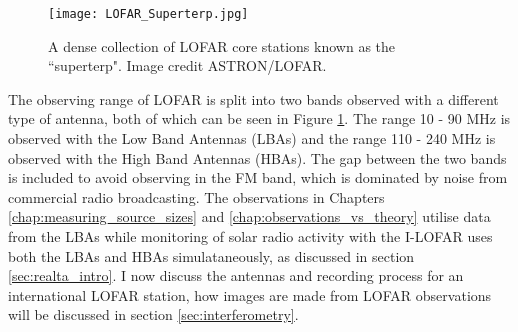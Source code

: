  
\begin{figure}
\centering
\texttt{[image: LOFAR\_Superterp.jpg]}
\caption[The LOFAR superterp]{A dense collection of LOFAR core stations known as the ``superterp". Image credit ASTRON/LOFAR.}
\label{fig:superterp}
\end{figure}

The observing range of LOFAR is split into two bands observed with a different type of antenna, both of which can be seen in Figure \ref{fig:superterp}. The range 10 - 90 MHz is observed with the Low Band Antennas (LBAs) and the range 110 - 240 MHz is observed with the High Band Antennas (HBAs). The gap between the two bands is included to avoid observing in the FM band, which is dominated by noise from commercial radio broadcasting. The observations in Chapters \ref{chap:measuring_source_sizes} and \ref{chap:observations_vs_theory} utilise data from the LBAs while monitoring of solar radio activity with the I-LOFAR uses both the LBAs and HBAs simulataneously, as discussed in section \ref{sec:realta_intro}. I now discuss the antennas and recording process for an international LOFAR station, how images are made from LOFAR observations will be discussed in section \ref{sec:interferometry}.
